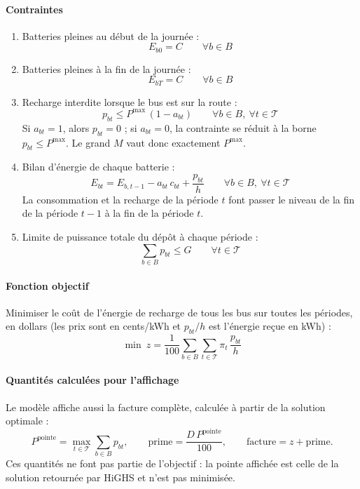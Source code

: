 \documentclass{article}
\begin{document}
\paragraph{Contraintes}
\begin{enumerate}
  \item Batteries pleines au début de la journée :
  \[ E_{b0} = C \qquad \forall b \in B \]

  \item Batteries pleines à la fin de la journée :
  \[ E_{bT} = C \qquad \forall b \in B \]

  \item Recharge interdite lorsque le bus est sur la route :
  \[ p_{bt} \leq P^{\max}\,(1 - a_{bt}) \qquad \forall b \in B,\ \forall t \in \mathcal{T} \]
  Si $a_{bt} = 1$, alors $p_{bt} = 0$ ; si $a_{bt} = 0$, la contrainte se réduit à la borne $p_{bt} \leq P^{\max}$. Le grand $M$ vaut donc exactement $P^{\max}$.

  \item Bilan d'énergie de chaque batterie :
  \[ E_{bt} = E_{b,t-1} - a_{bt}\,c_{bt} + \frac{p_{bt}}{h} \qquad \forall b \in B,\ \forall t \in \mathcal{T} \]
  La consommation et la recharge de la période $t$ font passer le niveau de la fin de la période $t-1$ à la fin de la période $t$.

  \item Limite de puissance totale du dépôt à chaque période :
  \[ \sum_{b \in B} p_{bt} \leq G \qquad \forall t \in \mathcal{T} \]
\end{enumerate}

\paragraph{Fonction objectif}
Minimiser le coût de l'énergie de recharge de tous les bus sur toutes les périodes, en dollars (les prix sont en cents/kWh et $p_{bt}/h$ est l'énergie reçue en kWh) :
\[ \min\ z = \frac{1}{100} \sum_{b \in B} \sum_{t \in \mathcal{T}} \pi_t \, \frac{p_{bt}}{h} \]

\paragraph{Quantités calculées pour l'affichage}
Le modèle affiche aussi la facture complète, calculée à partir de la solution optimale :
\[ P^{\text{pointe}} = \max_{t \in \mathcal{T}} \sum_{b \in B} p_{bt}, \qquad
   \text{prime} = \frac{D \, P^{\text{pointe}}}{100}, \qquad
   \text{facture} = z + \text{prime}. \]
Ces quantités ne font pas partie de l'objectif : la pointe affichée est celle de la solution retournée par HiGHS et n'est pas minimisée.
\end{document}
